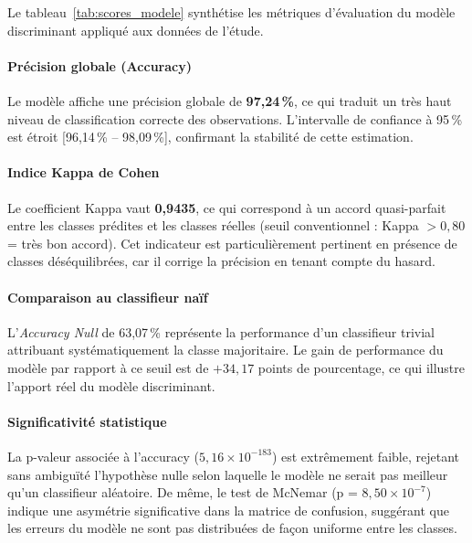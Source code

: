 \documentclass[12pt, a4paper, oneside]{report}
\begin{document}
		 Le tableau~\ref{tab:scores_modele} synthétise les métriques d'évaluation du modèle
		 discriminant appliqué aux données de l'étude.
		
		 \paragraph{Précision globale (Accuracy)}
		 Le modèle affiche une précision globale de \textbf{97,24\,\%}, ce qui traduit un très
		 haut niveau de classification correcte des observations. L'intervalle de confiance à
		 95\,\% est étroit [96,14\,\% -- 98,09\,\%], confirmant la stabilité de cette estimation.
		
		 \paragraph{Indice Kappa de Cohen}
		 Le coefficient Kappa vaut \textbf{0,9435}, ce qui correspond à un accord quasi-parfait
		 entre les classes prédites et les classes réelles (seuil conventionnel : Kappa $> 0{,}80$
		 = très bon accord). Cet indicateur est particulièrement pertinent en présence de classes
		 déséquilibrées, car il corrige la précision en tenant compte du hasard.
		
		 \paragraph{Comparaison au classifieur naïf}
		 L'\textit{Accuracy Null} de 63,07\,\% représente la performance d'un classifieur trivial
		 attribuant systématiquement la classe majoritaire. Le gain de performance du modèle
		 par rapport à ce seuil est de $+34{,}17$ points de pourcentage, ce qui illustre
		 l'apport réel du modèle discriminant.
		
		 \paragraph{Significativité statistique}
		 La p-valeur associée à l'accuracy ($5{,}16 \times 10^{-183}$) est extrêmement faible,
		 rejetant sans ambiguïté l'hypothèse nulle selon laquelle le modèle ne serait pas meilleur
		 qu'un classifieur aléatoire. De même, le test de McNemar (p = $8{,}50 \times 10^{-7}$)
		 indique une asymétrie significative dans la matrice de confusion, suggérant que les
		 erreurs du modèle ne sont pas distribuées de façon uniforme entre les classes.
		
\end{document}
